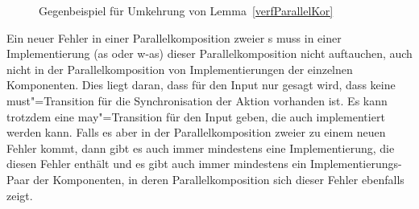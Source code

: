 \begin{figure}[htbp]
  \begin{center}
    \caption{Gegenbeispiel für Umkehrung von Lemma~\ref{verfParallelKor}}
    \label{impParallelFig}
  \end{center}
\end{figure}

Ein neuer Fehler in einer Parallelkomposition zweier \MEIO{}s
muss in einer Implementierung (as oder w-as) dieser Parallelkomposition nicht
auftauchen, auch nicht in der Parallelkomposition von Implementierungen der
einzelnen Komponenten. Dies liegt daran, dass für den Input nur gesagt wird,
dass keine must"=Transition für die Synchronisation der Aktion vorhanden ist.
Es kann trotzdem eine may"=Transition für den Input geben, die auch
implementiert werden kann. Falls es aber in der Parallelkomposition zweier
\MEIO{} zu einem neuen Fehler kommt, dann gibt es auch immer
mindestens eine Implementierung, die diesen Fehler enthält und es
gibt auch immer mindestens ein Implementierungs-Paar der Komponenten, in deren
Parallelkomposition sich dieser Fehler ebenfalls zeigt.
